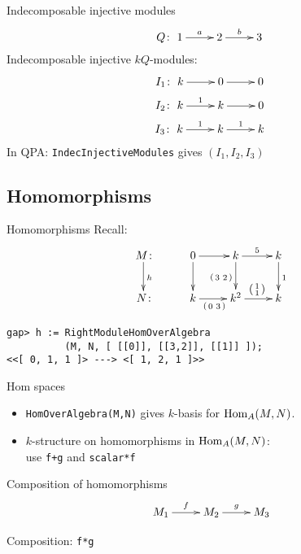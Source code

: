 \begin{frame}{Indecomposable injective modules}
\[
Q\colon
\xymatrix{1 \ar[r]^a & 2 \ar[r]^b & 3}
\]
Indecomposable injective $kQ$-modules:
\begin{gather*}
I_1\colon \xymatrix{k \ar[r]   & 0 \ar[r]   & 0} \\
I_2\colon \xymatrix{k \ar[r]^1 & k \ar[r]   & 0} \\
I_3\colon \xymatrix{k \ar[r]^1 & k \ar[r]^1 & k}
\end{gather*}
\pause
In QPA: \texttt{IndecInjectiveModules} gives $(I_1, I_2, I_3)$
\end{frame}


\subsection{Homomorphisms}

\begin{frame}[fragile]{Homomorphisms}
Recall:
\[
\xymatrix{
M \colon \ar@<-.2em>[d]^{h} &
0 \ar[r]     \ar[d] &
k \ar[r]^{5} \ar[d]_{\vv{3}{2}} &
k            \ar[d]^{1}
\\
N \colon &
k   \ar[r]_{\vv{0}{3}} &
k^2 \ar[r]^{\left( \begin{smallmatrix} 1 \\ 1 \end{smallmatrix} \right)} &
k
}
\]
\begin{verbatim}
gap> h := RightModuleHomOverAlgebra
          (M, N, [ [[0]], [[3,2]], [[1]] ]);
<<[ 0, 1, 1 ]> ---> <[ 1, 2, 1 ]>>
\end{verbatim}
\end{frame}

\begin{frame}{Hom spaces}
\begin{itemize}
\item \texttt{HomOverAlgebra(M,N)}
gives $k$-basis for $\operatorname{Hom}_A(M,N)$.
\item $k$-structure on homomorphisms in $\operatorname{Hom}_A(M,N)$:\\
use \texttt{f+g} and \texttt{scalar*f}
\end{itemize}
\end{frame}

\begin{frame}{Composition of homomorphisms}
\[
\xymatrix{
M_1 \ar[r]^f & M_2 \ar[r]^g & M_3
}
\]
\begin{center}
Composition: \texttt{f*g}
\end{center}
\end{frame}


